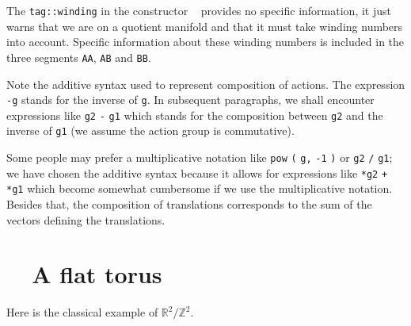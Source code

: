 The {\small\tt\textcolor{tag}{tag}::winding} in the constructor {\small\tt{}
} provides no specific information, it just warns {\maniFEM} that
we are on a quotient manifold and that it must take winding numbers into account.
Specific information about these winding numbers is included in the three segments
{\small\tt AA}, {\small\tt AB} and {\small\tt BB}.

Note the additive syntax used to represent composition of actions.
The expression {\small\tt -g} stands for the inverse of {\small\tt g}.
In subsequent paragraphs, we shall encounter expressions like
{\small\tt g2} {\small\tt -} {\small\tt g1} which stands for the composition between
{\small\tt g2} and the inverse of {\small\tt g1} (we assume the action group is commutative).

Some people may prefer a multiplicative notation like {\small\tt pow} {\small\tt (} {\small\tt g,}
{\small\tt -1} {\small\tt )} or {\small\tt g2} {\small\tt /} {\small\tt g1};
we have chosen the additive syntax because it allows for expressions like {\small\tt{}*g2}
{\small\tt +} {\small\tt{}*g1} which become somewhat cumbersome if we use
the multiplicative notation.
Besides that, the composition of translations corresponds to the sum of the vectors
defining the translations.


\section{~~A flat torus}\label{\numb section 7.\numb parag 4}

Here is the classical example of $ \mathbb{R}^2/{\mathbb Z}^2 $.

